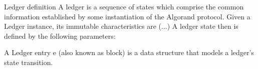 \documentclass[10pt,a4paper]{article}
\begin{document}
\begin{section}{Ledger definition}
A ledger is a sequence of states which comprise the common information established by some instantiation of the Algorand protocol. 
Given a Ledger instance, its immutable characteristics are (...)
A ledger state then is defined by the following parameters:

A Ledger entry e (also known as block) is a data structure that models a ledger's state transition.

\end{section}
\end{document}
